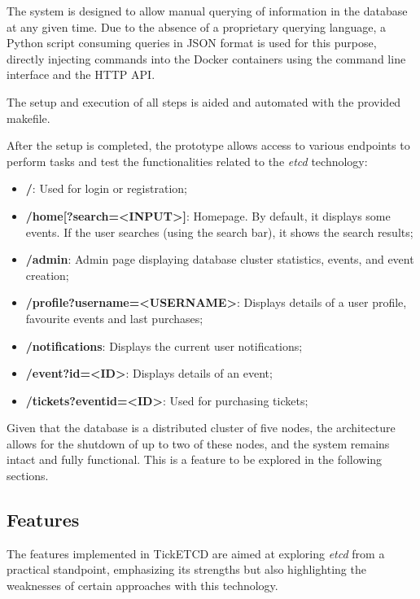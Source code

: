\documentclass[screen,review]{acmart}
\begin{document}
The system is designed to allow manual querying of information in the database at any given time. Due to the absence of a proprietary querying language, a Python script consuming queries in JSON format is used for this purpose, directly injecting commands into the Docker containers using the command line interface and the HTTP API.

The setup and execution of all steps is aided and automated with the provided makefile.

After the setup is completed, the prototype allows access to various endpoints to perform tasks and test the functionalities related to the \textit{etcd} technology:

\begin{itemize}
    \item \textbf{/}: Used for login or registration;
    \item \textbf{/home[?search=<INPUT>]}: Homepage. By default, it displays some events. If the user searches (using the search bar), it shows the search results;
    \item \textbf{/admin}: Admin page displaying database cluster statistics, events, and event creation;
    \item \textbf{/profile?username=<USERNAME>}: Displays details of a user profile, favourite events and last purchases;
    \item \textbf{/notifications}: Displays the current user notifications;
    \item \textbf{/event?id=<ID>}: Displays details of an event;
    \item \textbf{/tickets?eventid=<ID>}: Used for purchasing tickets;
\end{itemize}

Given that the database is a distributed cluster of five nodes, the architecture allows for the shutdown of up to two of these nodes, and the system remains intact and fully functional. This is a feature to be explored in the following sections.

\subsection{Features}

The features implemented in TickETCD are aimed at exploring \textit{etcd} from a practical standpoint, emphasizing its strengths but also highlighting the weaknesses of certain approaches with this technology. \\
\end{document}
